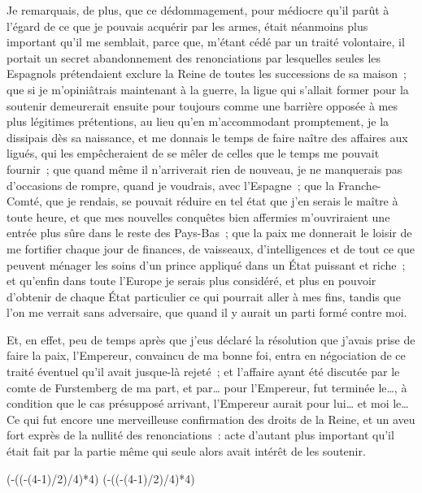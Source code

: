 \documentclass[french,twoside]{book} %
\def\truncdiv#1#2{((#1-(#2-1)/2)/#2)}
\def\moduloop#1#2{(#1-\truncdiv{#1}{#2}*#2)}
\def\modulo#1#2{\number\numexpr\moduloop{#1}{#2}\relax}
\begin{document}
Je remarquais, de plus, que ce dédommagement, pour médiocre qu’il parût à l’égard de ce que je pouvais acquérir par les armes, était néanmoins plus important qu’il me semblait, parce que, m’étant cédé par un traité volontaire, il portait un secret abandonnement des renonciations par lesquelles seules les Espagnols prétendaient exclure la Reine de toutes les successions de sa maison ; que si je m’opiniâtrais maintenant à la guerre, la ligue qui s’allait former pour la soutenir demeurerait ensuite pour toujours comme une barrière opposée à mes plus légitimes prétentions, au lieu qu’en m’accommodant promptement, je la dissipais dès sa naissance, et me donnais le temps de faire naître des affaires aux ligués, qui les empêcheraient de se mêler de celles que le temps me pouvait fournir ; que quand même il n’arriverait rien de nouveau, je ne manquerais pas d’occasions de rompre, quand je voudrais, avec l’Espagne ; que la Franche-Comté, que je rendais, se pouvait réduire en tel état que j’en serais le maître à toute heure, et que mes nouvelles conquêtes bien affermies m’ouvriraient une entrée plus sûre dans le reste des Pays-Bas ; que la paix me donnerait le loisir de me fortifier chaque jour de finances, de vaisseaux, d’intelligences et de tout ce que peuvent ménager les soins d’un prince appliqué dans un État puissant et riche ; et qu’enfin dans toute l’Europe je serais plus considéré, et plus en pouvoir d’obtenir de chaque État particulier ce qui pourrait aller à mes fins, tandis que l’on me verrait sans adversaire, que quand il y aurait un parti formé contre moi.\par
Et, en effet, peu de temps après que j’eus déclaré la résolution que j’avais prise de faire la paix, l’Empereur, convaincu de ma bonne foi, entra en négociation de ce traité éventuel qu’il avait jusque-là rejeté ; et l’affaire ayant été discutée par le comte de Furstemberg de ma part, et par… pour l’Empereur, fut terminée le…, à condition que le cas présupposé arrivant, l’Empereur aurait pour lui… et moi le… Ce qui fut encore une merveilleuse confirmation des droits de la Reine, et un aveu fort exprès de la nullité des renonciations : acte d’autant plus important qu’il était fait par la partie même qui seule alors avait intérêt de les soutenir.
 


\ifbooklet
  \pagestyle{empty}
  \clearpage
  \ifnum\modulo{\value{page}}{4}=0 \hbox{}\newpage\hbox{}\newpage\fi
  \ifnum\modulo{\value{page}}{4}=1 \hbox{}\newpage\hbox{}\newpage\fi
\end{document}
